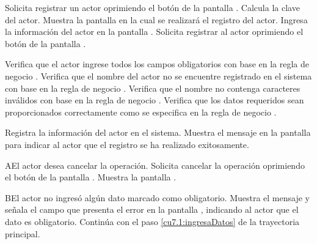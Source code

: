  \begin{UCtrayectoria}
    \UCpaso[\UCactor] Solicita registrar un actor oprimiendo el botón  de la pantalla .
    \UCpaso[\UCsist] Calcula la clave del actor.
    \UCpaso[\UCsist] Muestra la pantalla  en la cual se realizará el registro del actor. 
    \UCpaso[\UCactor] Ingresa la información del actor en la pantalla . \label{cu7.1:ingresaDatos}
    \UCpaso[\UCactor] Solicita registrar al actor oprimiendo el botón  de la pantalla . 
    
    \UCpaso[\UCsist] Verifica que el actor ingrese todos los campos obligatorios con base en la regla de negocio  . 
    \UCpaso[\UCsist] Verifica que el nombre del actor no se encuentre registrado en el sistema con base en la regla de negocio  . 
    \UCpaso[\UCsist] Verifica que el nombre no contenga caracteres inválidos con base en la regla de negocio . 
    \UCpaso[\UCsist] Verifica que los datos requeridos sean proporcionados correctamente como se especifica en la regla de negocio .  
    
    \UCpaso[\UCsist] Registra la información del actor en el sistema.
    \UCpaso[\UCsist] Muestra el mensaje  en la pantalla  
    para indicar al actor que el registro se ha realizado exitosamente.
 \end{UCtrayectoria}
 \begin{UCtrayectoriaA}{A}{El actor desea cancelar la operación.}
    \UCpaso[\UCactor] Solicita cancelar la operación oprimiendo el botón  de la pantalla .
    \UCpaso[\UCsist] Muestra la pantalla .
 \end{UCtrayectoriaA}
 \begin{UCtrayectoriaA}{B}{El actor no ingresó algún dato marcado como obligatorio.}
    \UCpaso[\UCsist] Muestra el mensaje  y señala el campo que presenta el error en la pantalla 
	    , indicando al actor que el dato es obligatorio.
    \UCpaso[] Continúa con el paso \ref{cu7.1:ingresaDatos} de la trayectoria principal.
 \end{UCtrayectoriaA}
